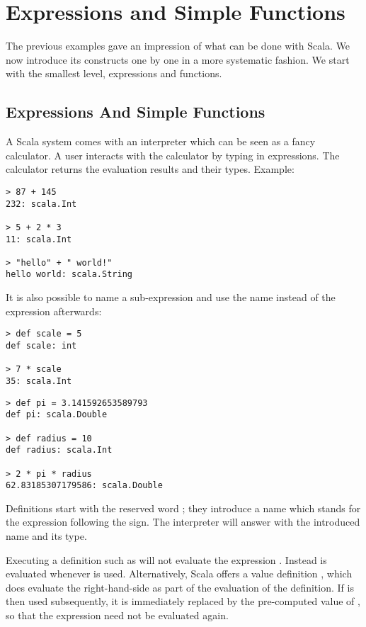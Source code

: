 \chapter{\label{chap:simple-funs}Expressions and Simple Functions}

The previous examples gave an impression of what can be done with
Scala.  We now introduce its constructs one by one in a more
systematic fashion. We start with the smallest level, expressions and
functions.

\section{Expressions And Simple Functions}

A Scala system comes with an interpreter which can be seen as a fancy
calculator. A user interacts with the calculator by typing in
expressions. The calculator returns the evaluation results and their
types. Example:

\begin{lstlisting}
> 87 + 145
232: scala.Int

> 5 + 2 * 3
11: scala.Int

> "hello" + " world!"
hello world: scala.String
\end{lstlisting}
It is also possible to name a sub-expression and use the name instead
of the expression afterwards:
\begin{lstlisting}
> def scale = 5
def scale: int

> 7 * scale
35: scala.Int
\end{lstlisting}
\begin{lstlisting}
> def pi = 3.141592653589793
def pi: scala.Double

> def radius = 10
def radius: scala.Int

> 2 * pi * radius
62.83185307179586: scala.Double
\end{lstlisting}
Definitions start with the reserved word ; they introduce a
name which stands for the expression following the \code{=} sign.  The
interpreter will answer with the introduced name and its type.

Executing a definition such as  will not evaluate the
expression .  Instead  is evaluated whenever 
is used. Alternatively, Scala offers a value definition 
, which does evaluate the right-hand-side  as part of the
evaluation of the definition. If  is then used subsequently,
it is immediately replaced by the pre-computed value of
, so that the expression need not be evaluated again.
 
